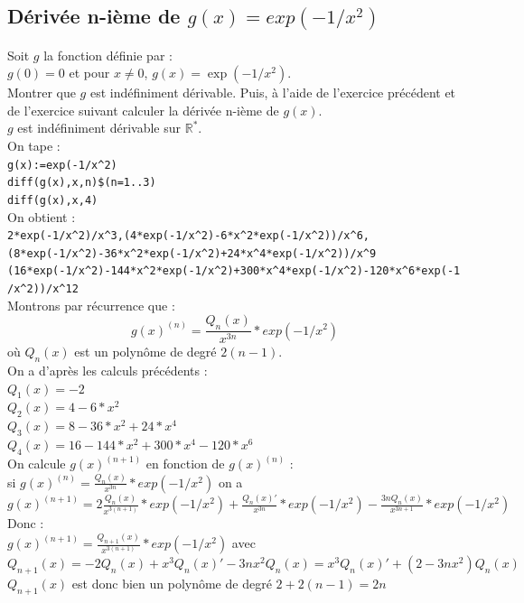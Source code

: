 \documentclass[a4paper,11pt]{book}
\newcommand{\R}{{\mathbb{R}}}
\begin{document}
\subsection{D\'eriv\'ee n-i\`eme de $g(x)=exp(-1/x^2)$}
Soit $g$ la fonction d\'efinie par :\\
$g(0)=0$ et pour $x\neq 0$, $g(x)=\exp(-1/x^2)$.\\
Montrer que $g$ est ind\'efiniment d\'erivable.
Puis, \`a l'aide de l'exercice pr\'ec\'edent et de l'exercice suivant calculer
la d\'eriv\'ee n-i\`eme de $g(x)$.\\
$g$ est ind\'efiniment d\'erivable sur $\R^*$.\\
On tape :\\
{\tt g(x):=exp(-1/x\verb|^|2)}\\
{\tt diff(g(x),x,n)\$(n=1..3)}\\
{\tt diff(g(x),x,4)}\\
On obtient :\\
{\tt 2*exp(-1/x\verb|^|2)/x\verb|^|3,(4*exp(-1/x\verb|^|2)-6*x\verb|^|2*exp(-1/x\verb|^|2))/x\verb|^|6,}\\
{\tt (8*exp(-1/x\verb|^|2)-36*x\verb|^|2*exp(-1/x\verb|^|2)+24*x\verb|^|4*exp(-1/x\verb|^|2))/x\verb|^|9}\\
{\tt (16*exp(-1/x\verb|^|2)-144*x\verb|^|2*exp(-1/x\verb|^|2)+300*x\verb|^|4*exp(-1/x\verb|^|2)-120*x\verb|^|6*exp(-1/x\verb|^|2))/x\verb|^|12}\\
Montrons par r\'ecurrence que : 
$$g(x)^{(n)}=\frac{Q_n(x)}{x^{3n}}*exp(-1/x^2)$$
o\`u $Q_n(x)$ est un polyn\^ome de degr\'e $2(n-1)$.\\
On a d'apr\`es les calculs pr\'ec\'edents :\\
$Q_1(x)=-2$\\
$Q_2(x)=4-6*x^2$\\
$Q_3(x)=8-36*x^2+24*x^4$\\
$Q_4(x)=16-144*x^2+300*x^4-120*x^6$\\
On calcule $g(x)^{(n+1)}$ en fonction de $g(x)^{(n)}$ :\\
si $g(x)^{(n)}=\frac{Q_n(x)}{x^{3n}}*exp(-1/x^2)$ on a \\
$g(x)^{(n+1)}=2\frac{Q_n(x)}{x^{3(n+1)}}*exp(-1/x^2)+\frac{Q_n(x)'}{x^{3n}}*exp(-1/x^2)-\frac{3nQ_n(x)}{x^{3n+1}}*exp(-1/x^2)$\\
Donc :\\
$g(x)^{(n+1)}=\frac{Q_{n+1}(x)}{x^{3(n+1)}}*exp(-1/x^2)$ avec \\
$Q_{n+1}(x)=-2Q_n(x)+x^3Q_n(x)'-3nx^2Q_n(x)=x^3Q_n(x)'+(2-3nx^2)Q_n(x)$
$Q_{n+1}(x)$ est donc bien un polyn\^ome de degr\'e $2+2(n-1)=2n$
\end{document}
